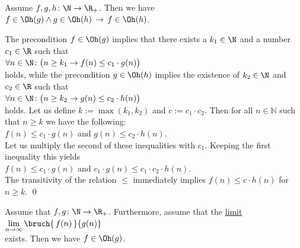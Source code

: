 \begin{Proposition} 
Assume $f,g,h \colon \N \rightarrow {\R_+}$. Then we have \\[0.2cm]
\hspace*{1.3cm}
 $f \in \Oh(g) \wedge g \in \Oh(h) \,\rightarrow\, f \in \Oh(h)$.

\end{Proposition}

\proof
The precondition $f \in \Oh(g)$ implies that there exists a $k_1 \in \N$ and a number $c_1 \in \R$
such that 
\\[0.2cm]
\hspace*{1.3cm} 
$\forall n \in \N \colon\bigl( n \geq k_1 \rightarrow f(n) \leq c_1 \cdot g(n)\bigr)$ 
\\[0.2cm]
holds, while the precondition $g \in \Oh(h)$ implies the existence of $k_2 \in \N$ and $c_2 \in \R$
such that \\[0.2cm]
\hspace*{1.3cm} 
$\forall n \in \N \colon\bigl( n \geq k_2 \rightarrow g(n) \leq c_2 \cdot h(n)\bigr)$ 
\\[0.2cm]
holds.  Let us define $k:= \max(k_1,k_2)$ and $c := c_1 \cdot c_2$.  Then for all $n \in \mathbb{N}$
such that $n \geq k$ we have the following:
\\[0.2cm]
\hspace*{1.3cm}
$f(n) \leq c_1\cdot g(n)$ \quad and \quad $g(n) \leq c_2 \cdot h(n)$. 
\\[0.2cm]
Let us multiply the second of these inequalities with $c_1$.  Keeping the first inequality this yields
\\[0.2cm]
\hspace*{1.3cm}
$f(n) \leq c_1\cdot g(n)$  \quad and \quad $c_1\cdot g(n) \leq c_1\cdot c_2 \cdot h(n)$. 
\\[0.2cm]
The transitivity of the relation $\leq$ immediately implies $f(n) \leq c \cdot h(n)$ for $n \geq k$.  
\qed

\begin{Proposition}  \label{limit}
  Assume that $f,g \colon \N \rightarrow {\R_+}$.   Furthermore, assume that the \href{https://en.wikipedia.org/wiki/Limit_(mathematics)#Limit_of_a_sequence}{limit}
  \\[0.3cm]
  \hspace*{3.3cm}
 $\lim\limits_{n \rightarrow \infty} \bruch{\,f(n)\,}{g(n)}$
  \\[0.2cm]
  exists.  Then we have $f \in \Oh(g)$. 
\end{Proposition}

